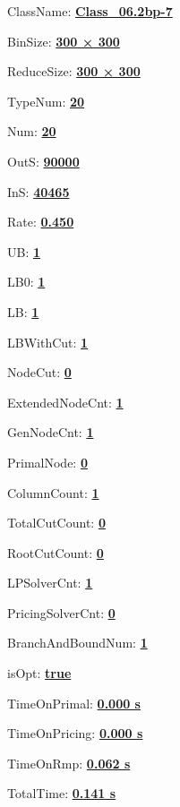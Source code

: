 \documentclass[11pt]{article}
\begin{document}
\pagestyle{empty}


ClassName: \underline{\textbf{Class_06.2bp-7}}
\par
BinSize: \underline{\textbf{300 × 300}}
\par
ReduceSize: \underline{\textbf{300 × 300}}
\par
TypeNum: \underline{\textbf{20}}
\par
Num: \underline{\textbf{20}}
\par
OutS: \underline{\textbf{90000}}
\par
InS: \underline{\textbf{40465}}
\par
Rate: \underline{\textbf{0.450}}
\par
UB: \underline{\textbf{1}}
\par
LB0: \underline{\textbf{1}}
\par
LB: \underline{\textbf{1}}
\par
LBWithCut: \underline{\textbf{1}}
\par
NodeCut: \underline{\textbf{0}}
\par
ExtendedNodeCnt: \underline{\textbf{1}}
\par
GenNodeCnt: \underline{\textbf{1}}
\par
PrimalNode: \underline{\textbf{0}}
\par
ColumnCount: \underline{\textbf{1}}
\par
TotalCutCount: \underline{\textbf{0}}
\par
RootCutCount: \underline{\textbf{0}}
\par
LPSolverCnt: \underline{\textbf{1}}
\par
PricingSolverCnt: \underline{\textbf{0}}
\par
BranchAndBoundNum: \underline{\textbf{1}}
\par
isOpt: \underline{\textbf{true}}
\par
TimeOnPrimal: \underline{\textbf{0.000 s}}
\par
TimeOnPricing: \underline{\textbf{0.000 s}}
\par
TimeOnRmp: \underline{\textbf{0.062 s}}
\par
TotalTime: \underline{\textbf{0.141 s}}
\par
\newpage
\end{document}
